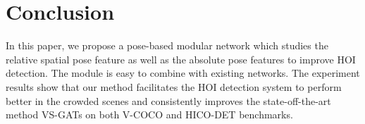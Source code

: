 \documentclass[10pt,twocolumn,letterpaper]{article}
\begin{document}
\section{Conclusion}\label{sec:conclusion}
In this paper, we propose a pose-based modular network which studies the relative spatial pose feature as well as the absolute pose features to improve HOI detection. The module is easy to combine with existing networks. The experiment results show that our method facilitates the HOI detection system to perform better in the crowded scenes and consistently improves the state-off-the-art method VS-GATs on both V-COCO and HICO-DET benchmarks. 




{
    \small
    
    
}
\end{document}
